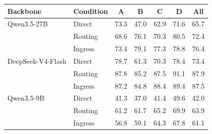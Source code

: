 \begin{tabular}{ll cccc c}
\toprule
Backbone & Condition & A & B & C & D & All \\
\midrule
Qwen3.5-27B & Direct & 73.3 & 47.0 & 62.9 & 71.6 & 65.7 \\
 & Routing & 68.6 & 76.1 & 70.3 & 80.5 & 72.4 \\
 & Ingress & 73.4 & 79.1 & 77.3 & 78.8 & 76.4 \\
DeepSeek-V4-Flash & Direct & 78.7 & 61.3 & 70.3 & 78.4 & 73.4 \\
 & Routing & 87.8 & 85.2 & 87.5 & 91.1 & 87.9 \\
 & Ingress & 87.2 & 84.8 & 88.4 & 89.4 & 87.5 \\
Qwen3.5-9B & Direct & 41.3 & 37.0 & 41.4 & 49.6 & 42.0 \\
 & Routing & 61.2 & 61.7 & 65.2 & 69.9 & 63.9 \\
 & Ingress & 56.8 & 59.1 & 64.3 & 67.8 & 61.1 \\
\bottomrule
\end{tabular}